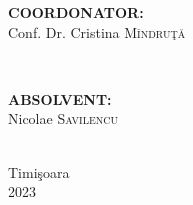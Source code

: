 \documentclass[12pt, a4paper]{report}
\begin{document}
\begin{titlepage}

	\begin{minipage}{0.4\textwidth}
		\begin{flushleft} \large
			\textbf{COORDONATOR:}\\
			Conf. Dr. Cristina \textsc{M\^ indru\c t\u a } %
		\end{flushleft}
	\end{minipage}
	~
	\begin{minipage}{0.4\textwidth}
		\begin{flushright} \large
			\textbf{ABSOLVENT:} \\
			Nicolae \textsc{Savilencu} %
		\end{flushright}
	\end{minipage}\\[1cm]


	\vfill
	{\large Timi\c{s}oara \\2023}\\ %




\end{titlepage}


\end{document}

